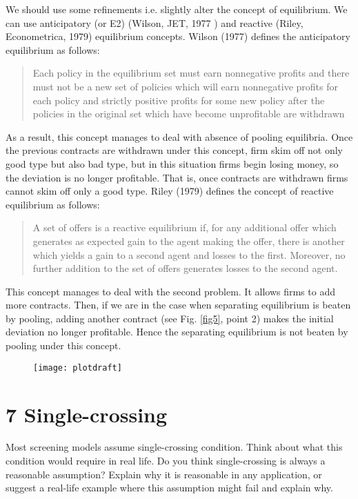 \documentclass[a4paper]{article}
\begin{document}
			We should use some refinements i.e. slightly alter the concept of equilibrium. We can use anticipatory (or E2) (Wilson, JET, 1977 ) and reactive (Riley, Econometrica, 1979) equilibrium concepts.
			Wilson (1977) defines the anticipatory equilibrium as follows:
			\begin{quote}
				Each policy in the equilibrium set must earn nonnegative profits and there must not be a new set of policies which will earn nonnegative profits for each policy and strictly positive profits for some new policy after the policies in the original set which have become unprofitable are withdrawn
			\end{quote} 
		As a result, this concept manages to deal with absence of pooling equilibria. Once the previous contracts are withdrawn under this concept, firm skim off not only good type but also bad type, but in this situation firms begin losing money, so the deviation is no longer profitable. That is, once contracts are withdrawn firms cannot skim off only a good type.
			Riley (1979) defines the concept of reactive equilibrium as follows:
			\begin{quote}
				A set of offers is a reactive equilibrium if, for any additional offer which generates as expected gain to the agent making the offer, there is another which yields a gain to a second agent and losses to the first. Moreover, no further addition to the set of offers generates losses to the second agent.
			\end{quote}
			This concept manages to deal with the second problem. It allows firms to add more contracts. Then, if we are in the case when separating equilibrium is beaten by pooling, adding another contract (see Fig. \eqref{fig5}, point 2) makes the initial deviation no longer profitable. Hence the separating equilibrium is not beaten by pooling under this concept.
				\begin{figure}[H]
				\centering
				\texttt{[image: plotdraft]}
				\caption{}\label{fig5}
			\end{figure}
		
		
		\section*{7 Single-crossing}
			Most screening models assume single-crossing condition. Think about what this condition
			would require in real life. Do you think single-crossing is always a reasonable assumption?
			Explain why it is reasonable in any application, or suggest a real-life example where this assumption might fail and explain why.
			
\end{document}
